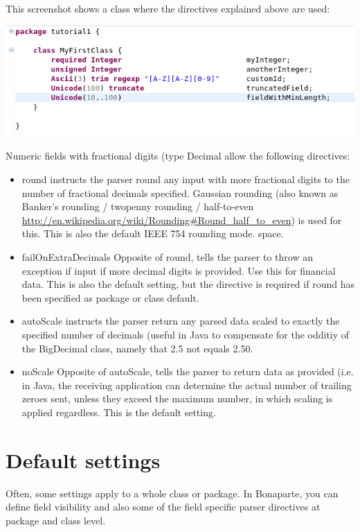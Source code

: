 \documentclass[11pt,a4paper,oneside]{article}
\begin{document}
This screenshot shows a class where the directives explained above are used:

\vspace{2mm}

\hspace{1cm}\includegraphics[scale=0.5]{images/tut1-005.png}

Numeric fields with fractional digits (type {\ttfamily Decimal} allow the following directives:
\begin{itemize}
  \item {\ttfamily round} instructs the parser round any input with more fractional digits to the number of fractional decimals
  specified. Gaussian rounding (also known as Banker's rounding / twopenny rounding / half-to-even
  \url{http://en.wikipedia.org/wiki/Rounding#Round_half_to_even}) is used for this. This is also the default IEEE 754 rounding
  mode. space.
  \item {\ttfamily failOnExtraDecimals} Opposite of {\ttfamily round}, tells the parser to throw an exception if input if more
  decimal digits is provided. Use this for financial data. This is also the default setting, but the directive is required if
  {\ttfamily round} has been specified as package or class default.
  \item {\ttfamily autoScale} instructs the parser return any parsed data scaled to exactly the specified number of decimals
  (useful in Java to compensate for the odditiy of the {\ttfamily BigDecimal} class, namely that 2.5 not equals 2.50.
  \item {\ttfamily noScale} Opposite of {\ttfamily autoScale}, tells the parser to return data as provided (i.e. in Java,
  the receiving application can determine the actual number of trailing zeroes sent, unless they exceed the maximum number, in
  which scaling is applied regardless. This is the default setting.
\end{itemize}

\section{Default settings}
Often, some settings apply to a whole class or package.
In Bonaparte, you can define field visibility and also some of the field specific parser directives at package and class level.
\end{document}

